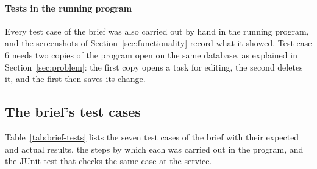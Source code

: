 \paragraph*{Tests in the running program} Every test case of the brief was also carried out by hand in the running
program, and the screenshots of Section~\ref{sec:functionality} record what it showed. Test case 6 needs two copies of
the program open on the same database, as explained in Section~\ref{sec:problem}: the first copy opens a task for
editing, the second deletes it, and the first then saves its change.

\subsection{The brief's test cases}

Table~\ref{tab:brief-tests} lists the seven test cases of the brief with their expected and actual results, the
steps by which each was carried out in the program, and the JUnit test that checks the same case at the service.

